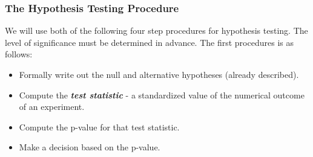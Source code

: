 \begin{frame}
\frametitle{The Hypothesis Testing Procedure }
We will use both of the following four step procedures for hypothesis testing. The level of significance must be determined in advance. The first procedures is as follows:

\begin{itemize}
\item Formally write out the null and alternative hypotheses (already described).
\item Compute the \emph{\textbf{test statistic}} - a standardized value of the numerical outcome of an experiment.
\item Compute the p-value for that test statistic.
\item Make a decision based on the p-value.
\end{itemize}
\end{frame}


